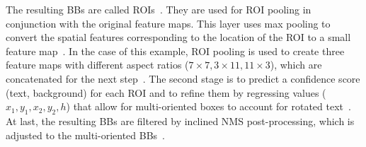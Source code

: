 The resulting \acp{BB} are called \acp{ROI}~\citep{ren_faster_2015,jiang_r2cnn_2017}.
They are used for \ac{ROI} pooling in conjunction with the original feature maps.
This layer uses max pooling to convert the spatial features corresponding to the location of the
\ac{ROI} to a small feature map~\citep{girshick_fast_2015}.
In the case of this example, \ac{ROI} pooling is used to create three feature maps with different
aspect ratios ($7\times7, 3\times11, 11\times3$), which are concatenated for the next
step~\citep{jiang_r2cnn_2017}.
The second stage is to predict a confidence score (text, background) for each \ac{ROI} and to
refine them by regressing values ($x_1,y_1,x_2,y_2,h$) that allow for multi-oriented boxes to
account for rotated text~\citep{jiang_r2cnn_2017}.
At last, the resulting \acp{BB} are filtered by inclined \ac{NMS} post-processing, which is
adjusted to the multi-oriented \acp{BB}~\citep{jiang_r2cnn_2017}.

